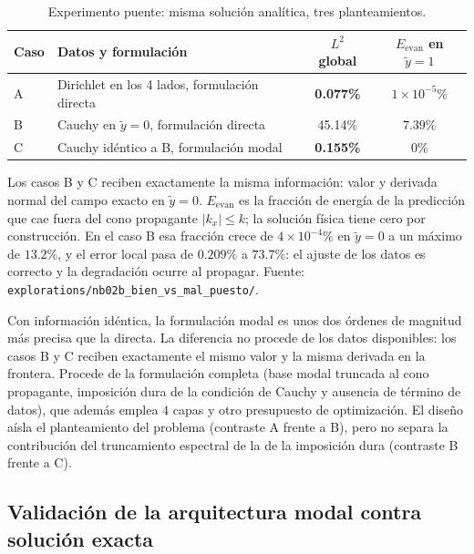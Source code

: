 \begin{table}[htbp]
\centering
\begin{threeparttable}
\caption{Experimento puente: misma solución analítica, tres planteamientos.}
\label{tab:nb02b}
\begin{tabular}{llcc}
\toprule
Caso & Datos y formulación & $L^2$ global & $E_\text{evan}$ en $\tilde y=1$ \\
\midrule
A & Dirichlet en los 4 lados, formulación directa & \textbf{0.077\%} & $1\times10^{-5}$\% \\
B & Cauchy en $\tilde y=0$, formulación directa   & 45.14\%          & $7.39\%$ \\
C & Cauchy idéntico a B, formulación modal        & \textbf{0.155\%} & $0\%$ \\
\bottomrule
\end{tabular}
\begin{tablenotes}\small
    \item Los casos B y C reciben exactamente la misma información: valor y
    derivada normal del campo exacto en $\tilde y=0$. $E_\text{evan}$ es la
    fracción de energía de la predicción que cae fuera del cono propagante
    $|k_x|\leq k$; la solución física tiene cero por construcción. En el caso B
    esa fracción crece de $4\times10^{-4}\%$ en $\tilde y=0$ a un máximo de
    $13.2\%$, y el error local pasa de $0.209\%$ a $73.7\%$: el ajuste de
    los datos es correcto y la degradación ocurre al propagar.
    Fuente: \texttt{explorations/nb02b\_bien\_vs\_mal\_puesto/}.
\end{tablenotes}
\end{threeparttable}
\end{table}

Con información idéntica, la formulación modal es unos dos órdenes de magnitud
más precisa que la directa. La diferencia no procede de los datos disponibles:
los casos B y C reciben exactamente el mismo valor y la misma derivada en la
frontera. Procede de la formulación completa (base modal truncada al cono
propagante, imposición dura de la condición de Cauchy y ausencia de término de
datos), que además emplea $4$ capas y otro presupuesto de optimización. El
diseño aísla el planteamiento del problema (contraste A frente a B), pero no
separa la contribución del truncamiento espectral de la de la imposición dura
(contraste B frente a C).

\subsection{Validación de la arquitectura modal contra solución exacta}
\label{sec:nb02b_arquitectura}


